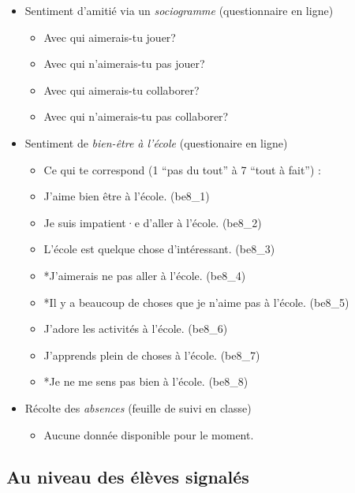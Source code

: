 \documentclass[
]{article}
\providecommand{\tightlist}{%
  \setlength{\itemsep}{0pt}\setlength{\parskip}{0pt}}
\begin{document}
\begin{itemize}
\item
  Sentiment d'amitié via un \emph{sociogramme} (questionnaire en ligne)

  \begin{itemize}
  \item
    Avec qui aimerais-tu jouer?
  \item
    Avec qui n'aimerais-tu pas jouer?
  \item
    Avec qui aimerais-tu collaborer?
  \item
    Avec qui n'aimerais-tu pas collaborer?
  \end{itemize}
\item
  Sentiment de \emph{bien-être à l'école} (questionaire en ligne)

  \begin{itemize}
  \item
    Ce qui te correspond (1 ``pas du tout'' à 7 ``tout à fait'') :
  \item
    J'aime bien être à l'école. (be8\_1)
  \item
    Je suis impatient·e d'aller à l'école. (be8\_2)
  \item
    L'école est quelque chose d'intéressant. (be8\_3)
  \item
    *J'aimerais ne pas aller à l'école. (be8\_4)
  \item
    *Il y a beaucoup de choses que je n'aime pas à l'école. (be8\_5)
  \item
    J'adore les activités à l'école. (be8\_6)
  \item
    J'apprends plein de choses à l'école. (be8\_7)
  \item
    *Je ne me sens pas bien à l'école. (be8\_8)
  \end{itemize}
\item
  Récolte des \emph{absences} (feuille de suivi en classe)

  \begin{itemize}
  \tightlist
  \item
    Aucune donnée disponible pour le moment.
  \end{itemize}
\end{itemize}

\hypertarget{au-niveau-des-uxe9luxe8ves-signaluxe9s}{%
\subsection{Au niveau des élèves signalés}\label{au-niveau-des-uxe9luxe8ves-signaluxe9s}}
\end{document}
